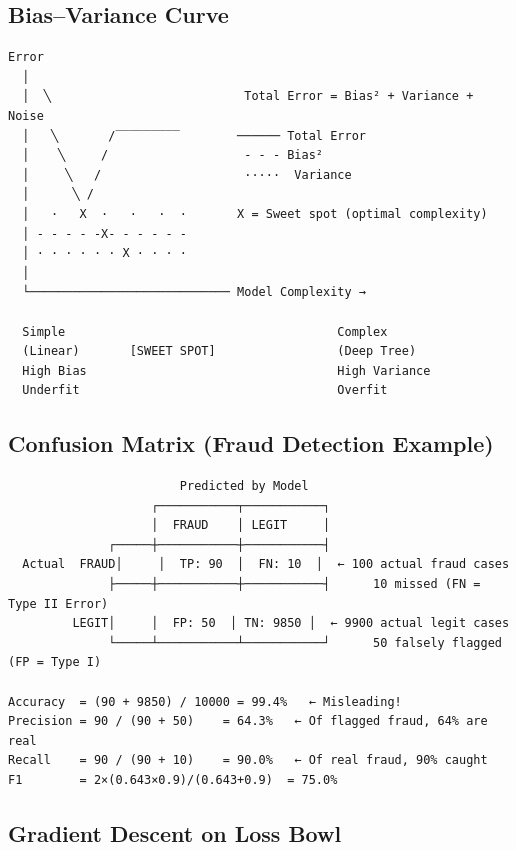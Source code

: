\documentclass[11pt]{article}
\begin{document}
\subsection{Bias--Variance Curve}\label{biasvariance-curve}

\setcodelang{}

\begin{verbatim}
Error
  │
  │  ╲                           Total Error = Bias² + Variance + Noise
  │   ╲       /‾‾‾‾‾‾‾‾‾        ────── Total Error
  │    ╲     /                   ‐ ‐ ‐ Bias²
  │     ╲   /                    ·····  Variance
  │      ╲ /
  │   ·   X  ·   ·   ·  ·       X = Sweet spot (optimal complexity)
  │ ‐ ‐ ‐ ‐ ‐X‐ ‐ ‐ ‐ ‐ ‐
  │ · · · · · · X · · · ·
  │
  └──────────────────────────── Model Complexity →
  
  Simple                                      Complex
  (Linear)       [SWEET SPOT]                 (Deep Tree)
  High Bias                                   High Variance
  Underfit                                    Overfit
\end{verbatim}

\subsection{Confusion Matrix (Fraud Detection Example)}\label{confusion-matrix-fraud-detection-example}

\setcodelang{}

\begin{verbatim}
                        Predicted by Model
                    ┌───────────┬───────────┐
                    │  FRAUD    │ LEGIT     │
              ┌─────┼───────────┼───────────┤
  Actual  FRAUD│     │  TP: 90  │  FN: 10  │  ← 100 actual fraud cases
              ├─────┼───────────┼───────────┤      10 missed (FN = Type II Error)
         LEGIT│     │  FP: 50  │ TN: 9850 │  ← 9900 actual legit cases
              └─────┴───────────┴───────────┘      50 falsely flagged (FP = Type I)

Accuracy  = (90 + 9850) / 10000 = 99.4%   ← Misleading! 
Precision = 90 / (90 + 50)    = 64.3%   ← Of flagged fraud, 64% are real
Recall    = 90 / (90 + 10)    = 90.0%   ← Of real fraud, 90% caught
F1        = 2×(0.643×0.9)/(0.643+0.9)  = 75.0%
\end{verbatim}

\subsection{Gradient Descent on Loss Bowl}\label{gradient-descent-on-loss-bowl}
\end{document}
